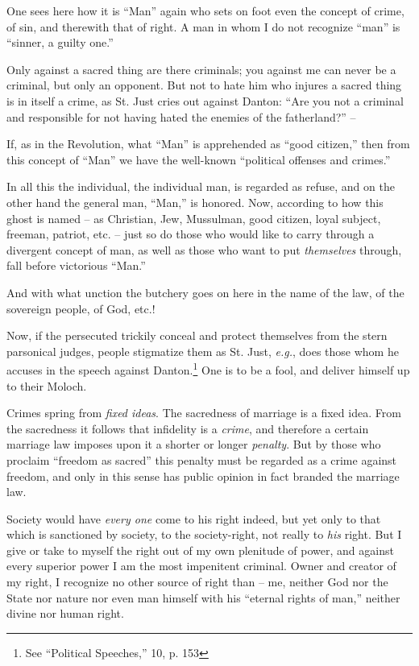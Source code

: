One sees here how it is ``Man'' again who sets on foot even the concept of 
crime, of sin, and therewith that of right. A man in whom I do not recognize 
``man'' is ``sinner, a guilty one.''

Only against a sacred thing are there criminals; you against me can never be a 
criminal, but only an opponent. But not to hate him who injures a sacred thing 
is in itself a crime, as St. Just cries out against Danton: ``Are you not a 
criminal and responsible for not having hated the enemies of the 
fatherland?'' --

If, as in the Revolution, what ``Man'' is apprehended as ``good citizen,'' 
then from this concept of ``Man'' we have the well-known ``political 
offenses and crimes.''

In all this the individual, the individual man, is regarded as refuse, and on 
the other hand the general man, ``Man,'' is honored. Now, according to how 
this ghost is named -- as Christian, Jew, Mussulman, good citizen, loyal 
subject, freeman, patriot, etc. -- just so do those who would like to carry 
through a divergent concept of man, as well as those who want to put 
\textit{themselves} through, fall before victorious ``Man.''

And with what unction the butchery goes on here in the name of the law, of the 
sovereign people, of God, etc.!

Now, if the persecuted trickily conceal and protect themselves from the stern 
parsonical judges, people stigmatize them as St. Just, \textit{e.g.}, does 
those whom he accuses in the speech against Danton.\footnote{See ``Political 
Speeches,'' 10, p. 153} One is to be a fool, and deliver himself up to their 
Moloch.

Crimes spring from \textit{fixed ideas}. The sacredness of marriage is a fixed 
idea. From the sacredness it follows that infidelity is a \textit{crime}, and 
therefore a certain marriage law imposes upon it a shorter or longer 
\textit{penalty}. But by those who proclaim ``freedom as sacred'' this 
penalty must be regarded as a crime against freedom, and only in this sense 
has public opinion in fact branded the marriage law.

Society would have \textit{every one} come to his right indeed, but yet only 
to that which is sanctioned by society, to the society-right, not really to 
\textit{his} right. But I give or take to myself the right out of my own 
plenitude of power, and against every superior power I am the most impenitent 
criminal. Owner and creator of my right, I recognize no other source of right 
than -- me, neither God nor the State nor nature nor even man himself with his 
``eternal rights of man,'' neither divine nor human right.

